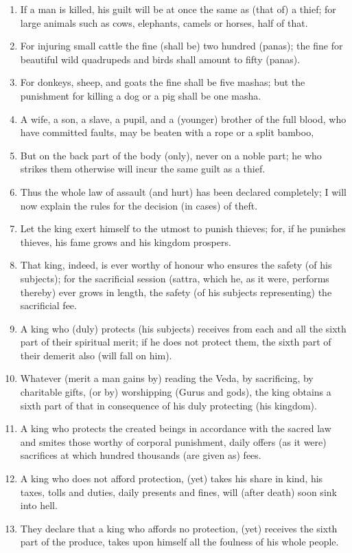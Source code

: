 \begin{enumerate}
\item If a man is killed, his guilt will be at once the same as (that of) a thief; for large animals such as cows, elephants, camels or horses, half of that.
\item For injuring small cattle the fine (shall be) two hundred (panas); the fine for beautiful wild quadrupeds and birds shall amount to fifty (panas).
\item For donkeys, sheep, and goats the fine shall be five mashas; but the punishment for killing a dog or a pig shall be one masha.
\item A wife, a son, a slave, a pupil, and a (younger) brother of the full blood, who have committed faults, may be beaten with a rope or a split bamboo,
\item But on the back part of the body (only), never on a noble part; he who strikes them otherwise will incur the same guilt as a thief.
\item Thus the whole law of assault (and hurt) has been declared completely; I will now explain the rules for the decision (in cases) of theft.
\item Let the king exert himself to the utmost to punish thieves; for, if he punishes thieves, his fame grows and his kingdom prospers.
\item That king, indeed, is ever worthy of honour who ensures the safety (of his subjects); for the sacrificial session (sattra, which he, as it were, performs thereby) ever grows in length, the safety (of his subjects representing) the sacrificial fee.
\item A king who (duly) protects (his subjects) receives from each and all the sixth part of their spiritual merit; if he does not protect them, the sixth part of their demerit also (will fall on him).
\item Whatever (merit a man gains by) reading the Veda, by sacrificing, by charitable gifts, (or by) worshipping (Gurus and gods), the king obtains a sixth part of that in consequence of his duly protecting (his kingdom).
\item A king who protects the created beings in accordance with the sacred law and smites those worthy of corporal punishment, daily offers (as it were) sacrifices at which hundred thousands (are given as) fees.
\item A king who does not afford protection, (yet) takes his share in kind, his taxes, tolls and duties, daily presents and fines, will (after death) soon sink into hell.
\item They declare that a king who affords no protection, (yet) receives the sixth part of the produce, takes upon himself all the foulness of his whole people.

\end{enumerate}
